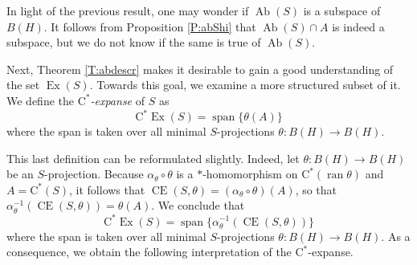 \documentclass[10pt]{amsart}
\newcommand{\rC}{\mathrm{C}}
\newcommand{\Ab}{\operatorname{Ab}}
\newcommand{\CE}{\operatorname{CE}}
\newcommand{\Exp}{\operatorname{Ex}}
\newcommand{\ran}{\operatorname{ran}}
\newcommand{\spn}{\operatorname{span}}
\theoremstyle{definition}
\begin{document}
In light of the previous result, one may wonder if $\Ab(S)$ is a subspace of $B(H)$. It follows from Proposition \ref{P:abShi} that $\Ab(S)\cap A$ is indeed a subspace, but we do not know if the same is true of $\Ab(S)$.

Next,  Theorem \ref{T:abdescr} makes it desirable to gain a good understanding of the set $\Exp(S)$. Towards this goal, we examine a more structured subset of it.  We define the \emph{$\rC^*$-expanse} of $S$ as
\[
\rC^*\Exp(S)=\spn\{\theta(A) \}
\] 
where the span is taken over all minimal $S$-projections $\theta:B(H)\to B(H)$.

This last definition can be reformulated slightly. Indeed, let $\theta:B(H)\to B(H)$ be an $S$-projection. Because $\alpha_\theta\circ \theta$ is a $*$-homomorphism on $\rC^*(\ran \theta)$ and $A=\rC^*(S)$, it follows that $\CE(S,\theta)=(\alpha_\theta\circ \theta)(A)$, so that $\alpha_\theta^{-1}(\CE(S,\theta))=\theta(A)$. We conclude that
\begin{equation}\label{Eq:exp}
\rC^*\Exp(S)=\spn\{\alpha_\theta^{-1}(\CE(S,\theta)) \}
\end{equation}
where the span is taken over all minimal $S$-projections $\theta:B(H)\to B(H)$.
As a consequence, we obtain the following interpretation of the $\rC^*$-expanse.
\end{document}
